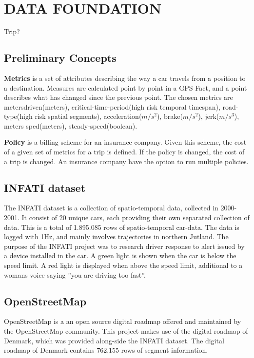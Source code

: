 \section{DATA FOUNDATION}\label{sec:datafound}




Trip?



\subsection{Preliminary Concepts}\label{subsec:precon}
\textbf{Metrics} is a set of attributes describing the way a car travels from a position  to a destination. Measures are calculated point by point in a GPS Fact, and a point describes what has changed since the previous point. The chosen metrics are metersdriven(meters), critical-time-period(high risk temporal timespan), road-type(high risk spatial segments), acceleration($m/s^2$), brake($m/s^2$), jerk($m/s^3$), meters sped(meters), steady-speed(boolean). 

\textbf{Policy} is a billing scheme for an insurance company. Given this scheme, the cost of a given set of metrics for a trip is defined. If the policy is changed, the cost of a trip is changed. An insurance company have the option to run multiple policies.

\subsection{INFATI dataset}
The INFATI dataset\cite{art:INFATI} is a collection of spatio-temporal data, collected in 2000-2001. It consist of 20 unique cars, each providing their own separated collection of data. This is a total of 1.895.085 rows of spatio-temporal car-data. The data is logged with 1Hz, and mainly involves trajectories in northern Jutland. The purpose of the INFATI\cite{art:INFATI} project was to research driver response to alert issued by a device installed in the car. A green light is shown when the car is below the speed limit. A red light is displayed when above the speed limit, additional to a womans voice saying ''you are driving too fast''.

\subsection{OpenStreetMap}
OpenStreetMap\cite{osm} is a an open source digital roadmap offered  and maintained by the OpenStreetMap community. This project makes use of the digital roadmap of Denmark, which was provided along-side the INFATI dataset\cite{art:INFATI}. The digital roadmap of Denmark contains 762.155 rows of segment information.